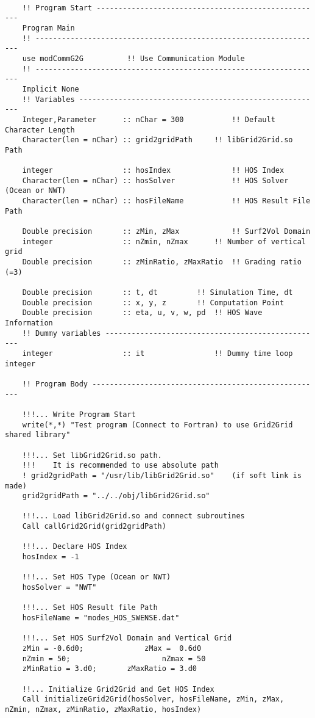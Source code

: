 		\begin{lstlisting}[language={[95]Fortran}]

	!! Program Start ----------------------------------------------------
	Program Main
	!! ------------------------------------------------------------------
	use modCommG2G			!! Use Communication Module
	!! ------------------------------------------------------------------
	Implicit None
	!! Variables --------------------------------------------------------
	Integer,Parameter      :: nChar = 300			!! Default Character Length
	Character(len = nChar) :: grid2gridPath		!! libGrid2Grid.so Path

	integer                :: hosIndex				!! HOS Index
	Character(len = nChar) :: hosSolver				!! HOS Solver (Ocean or NWT)
	Character(len = nChar) :: hosFileName			!! HOS Result File Path

	Double precision       :: zMin, zMax			!! Surf2Vol Domain
	integer                :: nZmin, nZmax		!! Number of vertical grid
	Double precision       :: zMinRatio, zMaxRatio	!! Grading ratio (=3)

	Double precision       :: t, dt			!! Simulation Time, dt
	Double precision       :: x, y, z		!! Computation Point
	Double precision       :: eta, u, v, w, pd	!! HOS Wave Information
	!! Dummy variables --------------------------------------------------
	integer                :: it				!! Dummy time loop integer

	!! Program Body -----------------------------------------------------

	!!!... Write Program Start
	write(*,*) "Test program (Connect to Fortran) to use Grid2Grid shared library"

	!!!... Set libGrid2Grid.so path.
	!!!    It is recommended to use absolute path
	! grid2gridPath = "/usr/lib/libGrid2Grid.so"	(if soft link is made)
	grid2gridPath = "../../obj/libGrid2Grid.so"

	!!!... Load libGrid2Grid.so and connect subroutines
	Call callGrid2Grid(grid2gridPath)

	!!!... Declare HOS Index
	hosIndex = -1

	!!!... Set HOS Type (Ocean or NWT)
	hosSolver = "NWT"

	!!!... Set HOS Result file Path
	hosFileName = "modes_HOS_SWENSE.dat"

	!!!... Set HOS Surf2Vol Domain and Vertical Grid
	zMin = -0.6d0; 				zMax =  0.6d0
	nZmin = 50; 					nZmax = 50
	zMinRatio = 3.d0; 		zMaxRatio = 3.d0

	!!... Initialize Grid2Grid and Get HOS Index
	Call initializeGrid2Grid(hosSolver, hosFileName, zMin, zMax, nZmin, nZmax, zMinRatio, zMaxRatio, hosIndex)


\end{lstlisting}
